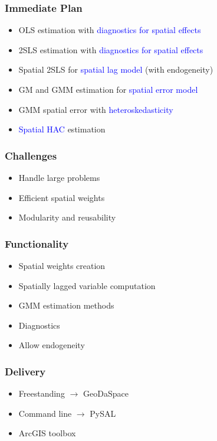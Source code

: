 \begin{frame}
	\frametitle{Immediate Plan}
 \begin{itemize}
     \item OLS estimation with \textcolor{blue}{diagnostics for spatial effects}
     \item 2SLS estimation with \textcolor{blue}{diagnostics for spatial effects}
     \item Spatial 2SLS for \textcolor{blue}{spatial lag model} (with endogeneity)
 \item GM and GMM estimation for \textcolor{blue}{spatial error model}
 \item GMM spatial error with \textcolor{blue}{heteroskedasticity}
 \item \textcolor{blue}{Spatial HAC} estimation
 \end{itemize}
 \end{frame} 

\begin{frame}
	\frametitle{Challenges}
 \begin{itemize}
 \item Handle large problems
 \item Efficient spatial weights
 \item Modularity and reusability
 \end{itemize}
 \end{frame} 

\begin{frame}
	\frametitle{Functionality}
 \begin{itemize}
 \item Spatial weights creation
 \item Spatially lagged variable computation
 \item GMM estimation methods
 \item Diagnostics
 \item Allow endogeneity
 \end{itemize}
 \end{frame} 

\begin{frame}
	\frametitle{Delivery}
 \begin{itemize}
 \item Freestanding $\rightarrow$ GeoDaSpace
 \item Command line $\rightarrow$ PySAL
 \item ArcGIS toolbox
 \end{itemize}
 \end{frame} 

